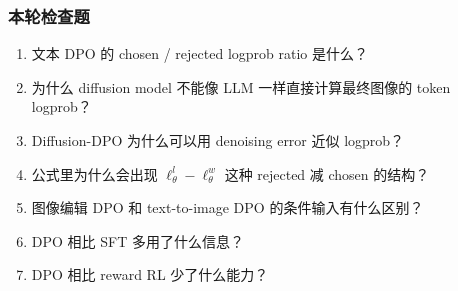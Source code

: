 \subsubsection{本轮检查题}

\begin{enumerate}[leftmargin=1.5em]
  \item 文本 DPO 的 chosen / rejected logprob ratio 是什么？
  \item 为什么 diffusion model 不能像 LLM 一样直接计算最终图像的 token logprob？
  \item Diffusion-DPO 为什么可以用 denoising error 近似 logprob？
  \item 公式里为什么会出现 $\ell_\theta^l-\ell_\theta^w$ 这种 rejected 减 chosen 的结构？
  \item 图像编辑 DPO 和 text-to-image DPO 的条件输入有什么区别？
  \item DPO 相比 SFT 多用了什么信息？
  \item DPO 相比 reward RL 少了什么能力？
\end{enumerate}
